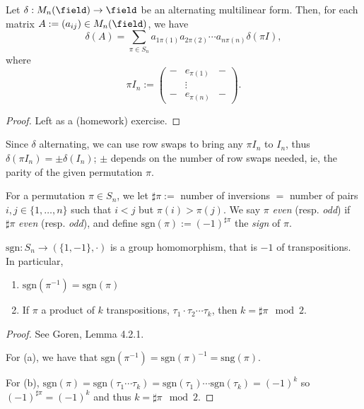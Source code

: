 \begin{proposition}\label{prop:alternatingmultilinearpermutations}
    Let $\delta : M_n{(\field)} \to \field$ be an alternating multilinear form. Then, for each matrix $A := (a_{ij}) \in M_n(\field)$, we have \[
    \delta(A)     = \sum_{ \pi \in S_n}a_{1 \pi(1)}a_{2 \pi(2)}\cdots a_{n\pi(n)} \delta(\pi I),
    \]
    where \[
    \pi I_n := \begin{pmatrix}
        - & e_{\pi(1)} & -\\
        & \vdots & \\
        - & e_{\pi(n)} & -
    \end{pmatrix}.
    \]
\end{proposition}
\begin{proof}
    Left as a (homework) exercise.
\end{proof}
\begin{remark}
    Since $\delta$ alternating, we can use row swaps to bring any $\pi I_n$ to $I_n$, thus $\delta(\pi I_n) = \pm \delta(I_n)$; $\pm$ depends on the number of row swaps needed, ie, the parity of the given permutation $\pi$.
\end{remark}

\begin{definition}[Parity]
    For a permutation $\pi \in S_n$, we let $\sharp \pi := $ number of inversions $ = $ number of pairs $i, j\in \{1, \dots, n\}$ such that $i < j$ but $\pi(i) > \pi(j)$. We say $\pi$ \emph{even} (resp. \emph{odd}) if $\sharp\pi$ \emph{even} (resp. \emph{odd}), and define $\text{sgn}(\pi) := (-1)^{\sharp \pi}$ the \emph{sign} of $\pi$.
\end{definition}

\begin{proposition}
    $\text{sgn} : S_n \to (\{1, -1\}, \cdot)$ is a group homomorphism, that is $-1$ of transpositions. In particular, \begin{enumerate}
        \item $\text{sgn}(\pi^{-1}) = \text{sgn}(\pi)$
        \item If $\pi$ a product of $k$ transpositions, $\tau_1 \cdot \tau_2 \cdots \tau_k$, then $k = \sharp \pi \mod 2$.
    \end{enumerate}
\end{proposition}

\begin{proof}
    See Goren, Lemma 4.2.1. 
    
    For (a), we have that $\text{sgn}(\pi^{-1}) = \text{sgn}(\pi)^{-1} = \text{sng}(\pi)$.

    For (b), $\text{sgn}(\pi) = \text{sgn}(\tau_1 \cdots \tau_k) = \text{sgn}(\tau_1) \cdots \text{sgn}(\tau_k) = (-1)^k$ so $(-1)^{\sharp \pi} = (-1)^k$ and thus $k = \sharp \pi \mod 2$.
\end{proof}

